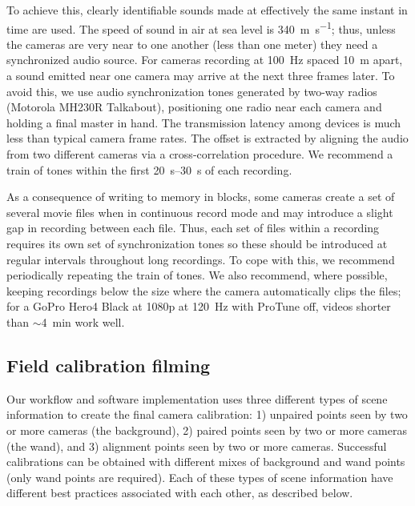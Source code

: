 \documentclass[fleqn,10pt]{wlpeerj}
\begin{document}
To achieve this, clearly identifiable sounds made at effectively the same instant in time are used.  The speed of sound in air at sea level is \SI{340}{\meter\per\second}; thus, unless the cameras are very near to one another (less than one meter) they need a synchronized audio source.  For cameras recording at \SI{100}{\hertz} spaced \SI{10}{\meter} apart, a sound emitted near one camera may arrive at the next three frames later. To avoid this, we use audio synchronization tones generated by two-way radios (Motorola MH230R Talkabout), positioning one radio near each camera and holding a final master in hand. The transmission latency among devices is much less than typical camera frame rates. The offset is extracted by aligning the audio from two different cameras via a cross-correlation procedure.  We recommend a train of tones within the first \SIrange{20}{30}{\second} of each recording.  

As a consequence of writing to memory in blocks, some cameras create a set of several movie files when in continuous record mode and may introduce a slight gap in recording between each file. Thus, each set of files within a recording requires its own set of synchronization tones so these should be introduced at regular intervals throughout long recordings.  To cope with this, we recommend periodically repeating the train of tones.  We also recommend, where possible, keeping recordings below the size where the camera automatically clips the files; for a GoPro Hero4 Black at 1080p at \SI{120}{\hertz} with ProTune off, videos shorter than $\sim$\SI{4}{\minute} work well.





 
\subsection*{Field calibration filming}
Our workflow and software implementation uses three different types of scene information to create the final camera calibration: 1) unpaired points seen by two or more cameras (the background), 2) paired points seen by two or more cameras (the wand), and 3) alignment points seen by two or more cameras. Successful calibrations can be obtained with different mixes of background and wand points (only wand points are required). Each of these types of scene information have different best practices associated with each other, as described below.
\end{document}
